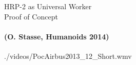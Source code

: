 
\begin{frame}{HRP-2 as Universal Worker\\Proof of Concept}
\framesubtitle{
  \textcolor{green!30!black!80}
  {
    (O. Stasse, Humanoids 2014)
  }
}
  \begin{center}
    {./videos/PocAirbus2013_12_Short.wmv}
  \end{center}
\end{frame}


